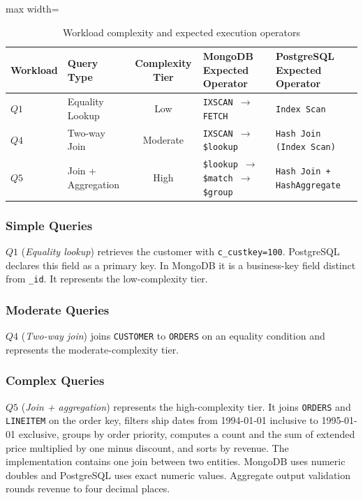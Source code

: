 \documentclass[10pt,a4paper,twocolumn]{article}
\begin{document}
\begin{table}[t]
\caption{Workload complexity and expected execution operators}
\label{tab:complexity}
\centering\small
\renewcommand{\arraystretch}{1.3}
\begin{adjustbox}{max width=\textwidth}
\begin{tabular}{@{}llcll@{}}
\toprule
\textbf{Workload} & \textbf{Query Type} & \textbf{Complexity Tier}
  & \textbf{MongoDB Expected Operator}
  & \textbf{PostgreSQL Expected Operator} \\ \midrule
$Q1$ & Equality Lookup    & Low      & \texttt{IXSCAN $\to$ FETCH}
     & \texttt{Index Scan} \\
$Q4$ & Two-way Join       & Moderate & \texttt{IXSCAN $\to$ \$lookup}
     & \texttt{Hash Join (Index Scan)} \\
$Q5$ & Join + Aggregation & High     & \texttt{\$lookup $\to$ \$match $\to$ \$group}
     & \texttt{Hash Join + HashAggregate} \\
\bottomrule
\end{tabular}
\end{adjustbox}
\end{table}

\subsubsection{Simple Queries}
$Q1$ (\emph{Equality lookup}) retrieves the customer with \texttt{c\_custkey=100}. PostgreSQL declares this field as a primary key. In MongoDB it is a business-key field distinct from \texttt{\_id}. It represents the low-complexity tier.

\subsubsection{Moderate Queries}
$Q4$ (\emph{Two-way join}) joins \texttt{CUSTOMER} to \texttt{ORDERS} on an equality condition and represents the moderate-complexity tier.

\subsubsection{Complex Queries}
$Q5$ (\emph{Join + aggregation}) represents the high-complexity tier. It joins \texttt{ORDERS} and \texttt{LINEITEM} on the order key, filters ship dates from 1994-01-01 inclusive to 1995-01-01 exclusive, groups by order priority, computes a count and the sum of extended price multiplied by one minus discount, and sorts by revenue. The implementation contains one join between two entities. MongoDB uses numeric doubles and PostgreSQL uses exact numeric values. Aggregate output validation rounds revenue to four decimal places.
\end{document}
